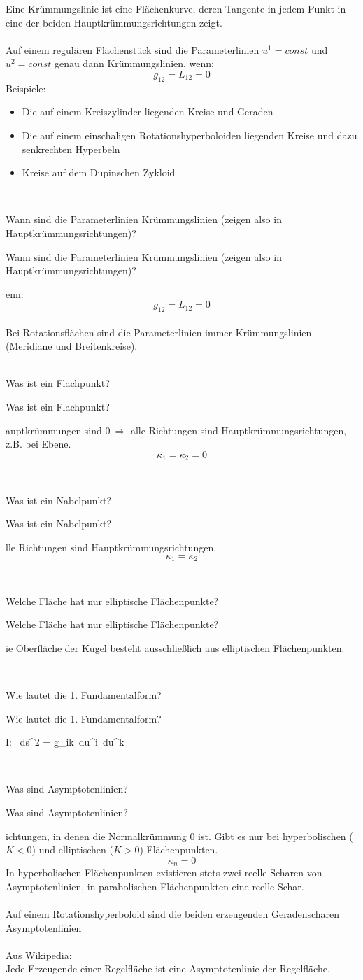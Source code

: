 \documentclass[DIV=1]{scrartcl}
\newcommand{\frage}[3][10]{
    \newpage
    \ 
    \vspace{#1 em}
    \begin{framed}
        #2
    \end{framed}
    \newpage
    \begin{framed}
        #2
    \end{framed}
    \vspace{2 em}
}
\begin{document}
Eine Krümmungslinie ist eine Flächenkurve, deren Tangente in jedem Punkt in eine der beiden Hauptkrümmungsrichtungen zeigt.\\
\\
Auf einem regulären Flächenstück sind die Parameterlinien $u^1 = const$ und $u^2 = const$ genau dann Krümmungslinien, wenn:
\[
    g_{12} = L_{12} = 0
\]
Beispiele:\\
\begin{itemize}
    \item Die auf einem Kreiszylinder liegenden Kreise und Geraden
    \item Die auf einem einschaligen Rotationshyperboloiden liegenden Kreise und dazu senkrechten Hyperbeln
    \item Kreise auf dem Dupinschen Zykloid
\end{itemize}



\frage{Wann sind die Parameterlinien Krümmungslinien (zeigen also in Hauptkrümmungsrichtungen)?}

Wenn:
\[
    g_{12} = L_{12} = 0
\]
\\
Bei Rotationsflächen sind die Parameterlinien immer Krümmungslinien (Meridiane und Breitenkreise).\\



\frage{ Was ist ein Flachpunkt?}

Hauptkrümmungen sind $0\ \Rightarrow$ alle Richtungen sind Haupt\-krüm\-mungs\-rich\-tung\-en, z.B. bei Ebene.
\[
    \kappa_1 = \kappa_2 = 0
\]



\frage{Was ist ein Nabelpunkt?}

Alle Richtungen sind Hauptkrümmungsrichtungen.
\[
    \kappa_1 = \kappa_2
\]



\frage{Welche Fläche hat nur elliptische Flächenpunkte?}

Die Oberfläche der Kugel besteht ausschließlich aus elliptischen Flächen\-punkten.



\frage{Wie lautet die 1. Fundamentalform?}

\[
    I: \ ds^2 = g_{ik}\, du^i\, du^k
\]



\frage{Was sind Asymptotenlinien?}

Richtungen, in denen die Normalkrümmung $0$ ist. Gibt es nur bei hyperbolischen ($K<0$) und elliptischen ($K>0$) Flächenpunkten.
\[
    \kappa_n = 0
\]
In hyperbolischen Flächenpunkten existieren stets zwei reelle Scharen von Asymptotenlinien, in parabolischen Flächenpunkten eine reelle Schar.\\
\\
Auf einem Rotationshyperboloid sind die beiden erzeugenden Geradenscharen Asymptotenlinien\\
\\
Aus Wikipedia:\\
Jede Erzeugende einer Regelfläche ist eine Asymptotenlinie der Regelfläche.
\end{document}
